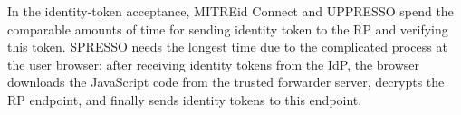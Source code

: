 In the identity-token acceptance,
 MITREid Connect and UPPRESSO spend the comparable amounts of time for sending identity token to the RP and verifying this token.
SPRESSO needs the longest time due to the complicated process at the user browser:
        after receiving identity tokens from the IdP,
        the browser downloads the JavaScript code from the trusted forwarder server,
            decrypts the RP endpoint, and finally sends identity tokens to this endpoint.



